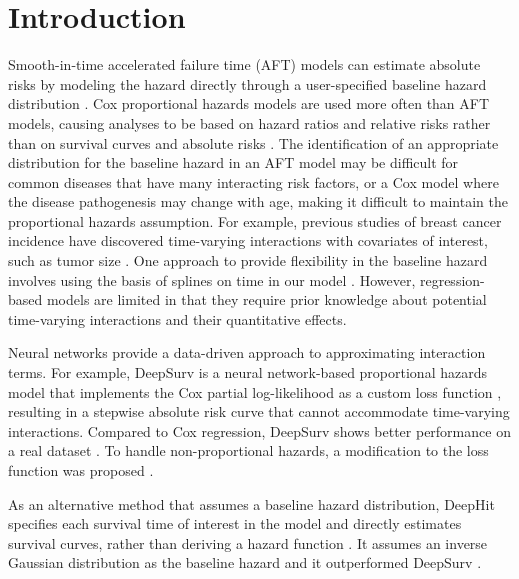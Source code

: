 \documentclass[APA,LATO1COL]{WileyNJD-v2}
\begin{document}



\maketitle




\hypertarget{introduction}{%
\section{Introduction}\label{introduction}}

Smooth-in-time accelerated failure time (AFT) models can estimate
absolute risks by modeling the hazard directly through a user-specified
baseline hazard distribution \citep{kleinbaum2012survival}. Cox
proportional hazards models are used more often than AFT models, causing
analyses to be based on hazard ratios and relative risks rather than on
survival curves and absolute risks \citep{hanley2009}. The
identification of an appropriate distribution for the baseline hazard in
an AFT model may be difficult for common diseases that have many
interacting risk factors, or a Cox model where the disease pathogenesis
may change with age, making it difficult to maintain the proportional
hazards assumption. For example, previous studies of breast cancer
incidence have discovered time-varying interactions with covariates of
interest, such as tumor size \citep{coradini2000time}. One approach to
provide flexibility in the baseline hazard involves using the basis of
splines on time in our model \citep{royston2002flexible}. However,
regression-based models are limited in that they require prior knowledge
about potential time-varying interactions and their quantitative
effects.

Neural networks provide a data-driven approach to approximating
interaction terms. For example, DeepSurv is a neural network-based
proportional hazards model that implements the Cox partial
log-likelihood as a custom loss function \citep{katzman2018DeepSurv},
resulting in a stepwise absolute risk curve that cannot accommodate
time-varying interactions. Compared to Cox regression, DeepSurv shows
better performance on a real dataset \citep{katzman2018DeepSurv}. To handle
non-proportional hazards, a modification to the loss function was
proposed \citep{faraggi1995neural}. 

As an alternative method that assumes a baseline hazard distribution,
DeepHit specifies each survival time of interest in the model and
directly estimates survival curves, rather than deriving a hazard
function . It assumes an inverse Gaussian
distribution as the baseline hazard and it outperformed DeepSurv \citep{lee2018DeepHit}.
\end{document}
